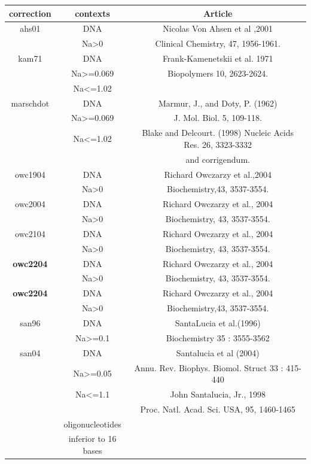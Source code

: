\documentclass{article}
\begin{document}
\begin{table}[hc]
\begin{tabular}[h]{| c | c | c |}
\textbf{correction} & \textbf{contexts} & \textbf{Article} \\
\hline
ahs01 & DNA & Nicolas Von Ahsen et al ,2001 \\
 & Na>0 & Clinical Chemistry, 47, 1956-1961.\\
 \hline
kam71 & DNA & Frank-Kamenetskii et al. 1971 \\
 & Na>=0.069  & Biopolymers 10, 2623-2624.\\
 & Na<=1.02  & \\
 \hline
marschdot & DNA & Marmur, J., and Doty, P. (1962) \\
 & Na>=0.069  & J. Mol. Biol. 5, 109-118.\\
 & Na<=1.02 & Blake and Delcourt. (1998) Nucleic Acids Res. 26, 3323-3332 \\ 
 & & and corrigendum.\\
 \hline
owc1904 & DNA & Richard Owczarzy et al.,2004  \\
 & Na>0 & Biochemistry,43, 3537-3554.\\
 \hline
owc2004 & DNA & Richard Owczarzy et al., 2004 \\
 & Na>0 & Biochemistry, 43, 3537-3554.\\ 
 \hline
owc2104 & DNA & Richard Owczarzy et al., 2004 \\
 & Na>0 & Biochemistry, 43, 3537-3554.\\
 \hline 
\textbf{owc2204} & DNA & Richard Owczarzy et al., 2004 \\
 & Na>0 & Biochemistry, 43, 3537-3554.\\
 \hline
\textbf{owc2204} & DNA & Richard Owczarzy et al., 2004 \\
 & Na>0 & Biochemistry,43, 3537-3554.\\
 \hline
san96 & DNA & SantaLucia et al.(1996) \\
 & Na>=0.1 & Biochemistry 35 : 3555-3562\\
 \hline
san04 & DNA & Santalucia et al (2004) \\
 & Na>=0.05 & Annu. Rev. Biophys. Biomol. Struct 33 : 415-440\\
 & Na<=1.1 & John Santalucia, Jr., 1998 \\
 & & Proc. Natl. Acad. Sci. USA, 95, 1460-1465 \\
 & oligonucleotides & \\
 & inferior to 16 bases & \\   

\end{tabular}
\end{table}
\end{document}
